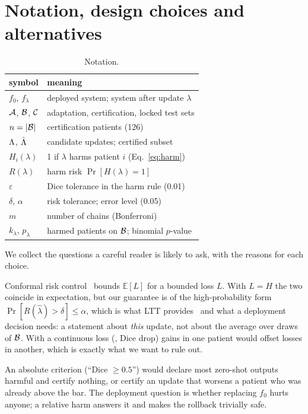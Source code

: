 \section{Notation, design choices and alternatives}
\label{sec:supp_faq}

\begin{table}[h]
\centering
\caption{Notation.}
\label{tab:supp_notation}
\footnotesize
\begin{tabular}{@{}ll@{}}
\toprule
symbol & meaning \\
\midrule
$f_0$, $f_\lambda$ & deployed system; system after update $\lambda$ \\
$\mathcal{A}$, $\mathcal{B}$, $\mathcal{C}$ & adaptation, certification, locked test sets \\
$n=|\mathcal{B}|$ & certification patients (126) \\
$\Lambda$, $\hat{\Lambda}$ & candidate updates; certified subset \\
$H_i(\lambda)$ & 1 if $\lambda$ harms patient $i$ (Eq.~\ref{eq:harm}) \\
$R(\lambda)$ & harm risk $\Pr[H(\lambda)=1]$ \\
$\varepsilon$ & Dice tolerance in the harm rule (0.01) \\
$\delta$, $\alpha$ & risk tolerance; error level (0.05) \\
$m$ & number of chains (Bonferroni) \\
$k_\lambda$, $p_\lambda$ & harmed patients on $\mathcal{B}$; binomial $p$-value \\
\bottomrule
\end{tabular}
\end{table}

We collect the questions a careful reader is likely to ask, with the reasons for each choice.

Conformal risk control~\cite{angelopoulos2024crc} bounds $\mathbb{E}[L]$ for a bounded loss $L$. With $L=H$ the two coincide in expectation, but our guarantee is of the high-probability form $\Pr[R(\hat\lambda)>\delta]\le\alpha$, which is what LTT provides~\cite{angelopoulos2021ltt} and what a deployment decision needs: a statement about \emph{this} update, not about the average over draws of $\mathcal{B}$. With a continuous loss (\eg, Dice drop) gains in one patient would offset losses in another, which is exactly what we want to rule out.

An absolute criterion (``Dice $\ge0.5$'') would declare most zero-shot outputs harmful and certify nothing, or certify an update that worsens a patient who was already above the bar. The deployment question is whether replacing $f_0$ hurts anyone; a relative harm answers it and makes the rollback trivially safe.

